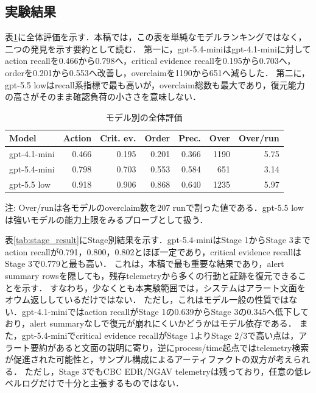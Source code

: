 \documentclass[a4paper,twocolumn,10pt]{article}
\newcommand{\code}[1]{{\small\ttfamily #1}}
\begin{document}
\subsection{実験結果}

表\ref{tab:overall}に全体評価を示す．本稿では，この表を単純なモデルランキングではなく，二つの発見を示す要約として読む．
第一に，\code{gpt-5.4-mini}は\code{gpt-4.1-mini}に対してaction recallを0.466から0.798へ，critical evidence recallを0.195から0.703へ，orderを0.201から0.553へ改善し，overclaimを1190から651へ減らした．
第二に，\code{gpt-5.5 low}はrecall系指標で最も高いが，overclaim総数も最大であり，復元能力の高さがそのまま確認負荷の小ささを意味しない．

\begin{table}[t]
\centering
\footnotesize
\caption{モデル別の全体評価}
\label{tab:overall}
\setlength{\tabcolsep}{2pt}
\begin{tabular}{@{}lrrrrrr@{}}
\toprule
Model & Action & Crit. ev. & Order & Prec. & Over & Over/run \\
\midrule
\code{gpt-4.1-mini} & 0.466 & 0.195 & 0.201 & 0.366 & 1190 & 5.75 \\
\code{gpt-5.4-mini} & 0.798 & 0.703 & 0.553 & 0.584 & 651 & 3.14 \\
\midrule
\code{gpt-5.5 low} & 0.918 & 0.906 & 0.868 & 0.640 & 1235 & 5.97 \\
\bottomrule
\end{tabular}
\par\raggedright\scriptsize 注: Over/runは各モデルのoverclaim数を207 runで割った値である．\code{gpt-5.5 low}は強いモデルの能力上限をみるプローブとして扱う．
\end{table}


表\ref{tab:stage_result}にStage別結果を示す．\code{gpt-5.4-mini}はStage 1からStage 3までaction recallが0.791，0.800，0.802とほぼ一定であり，critical evidence recallはStage 3で0.779と最も高い．
これは，本稿で最も重要な結果であり，alert summary rowsを隠しても，残存telemetryから多くの行動と証跡を復元できることを示す．
すなわち，少なくとも本実験範囲では，システムはアラート文面をオウム返ししているだけではない．
ただし，これはモデル一般の性質ではない．\code{gpt-4.1-mini}ではaction recallがStage 1の0.639からStage 3の0.345へ低下しており，alert summaryなしで復元が崩れにくいかどうかはモデル依存である．
また，\code{gpt-5.4-mini}でcritical evidence recallがStage 1よりStage 2/3で高い点は，アラート要約があると文面の説明に寄り，逆にprocess/time起点ではtelemetry検索が促進された可能性と，サンプル構成によるアーティファクトの双方が考えられる．
ただし，Stage 3でもCBC EDR/NGAV telemetryは残っており，任意の低レベルログだけで十分と主張するものではない．
\end{document}
